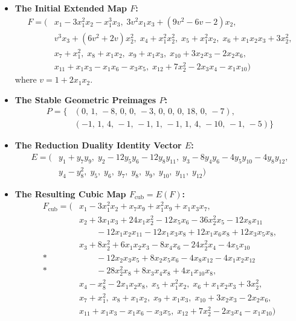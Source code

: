 \documentclass[11pt,a4paper]{article}
\begin{document}
\begin{itemize}
    \item \textbf{The Initial Extended Map $F$:} 
    \begin{align*}
    F = \big( & x_1 - 3x_1^2x_2 - x_1^3x_3, \; 3v^2x_1x_3 + (9v^2-6v-2)x_2, \\ 
    & v^3x_3 + (6v^2+2v)x_2^2, \; x_4 + x_1^2x_2^2, \; x_5 + x_1^2x_2, \; x_6 + x_1x_2x_3 + 3x_2^2, \\
    & x_7 + x_1^2, \; x_8 + x_1x_2, \; x_9 + x_1x_3, \; x_{10} + 3x_2x_3 - 2x_2 x_6, \\
    & x_{11} + x_1x_3 - x_1x_6 - x_3x_5, \; x_{12} + 7x_2^2 - 2x_3x_4 - x_1x_{10} \big)
    \end{align*}
    where $v = 1 + 2x_1x_2$.
    
    \item \textbf{The Stable Geometric Preimages $P$:}
    \begin{align*}
    P = \big\{ & (0, \, 1, \, -8, \, 0, \, 0, \, -3, \, 0, \, 0, \, 0, \, 18, \, 0, \, -7), \\
               & (-1, \, 1, \, 4, \, -1, \, -1, \, 1, \, -1, \, 1, \, 4, \, -10, \, -1, \, -5) \big\}
    \end{align*}
    
    \item \textbf{The Reduction Duality Identity Vector $E$:}
    \begin{align*}
    E = \big( & y_1 + y_7y_9, \; y_2 - 12y_5y_6 - 12y_8y_{11}, \; y_3 - 8y_4y_6 - 4y_5y_{10} - 4y_8y_{12}, \\
              & y_4 - y_8^2, \; y_5, \; y_6, \; y_7, \; y_8, \; y_9, \; y_{10}, \; y_{11}, \; y_{12} \big)
    \end{align*}
    
    \item \textbf{The Resulting Cubic Map $F_{\text{cub}} = E(F)$:}
    \begin{align*}
    F_{\text{cub}} = \big( & x_1 - 3x_1^2x_2 + x_7x_9 + x_1^2x_9 + x_1x_3x_7, \\
    & x_2  + 3x_1x_3 + 24x_1x_2^2 - 12x_5x_6 - 36x_2^2x_5 - 12x_8x_{11} \\
    & \qquad - 12x_1x_2x_{11} - 12x_1x_3x_8 + 12x_1x_6x_8 + 12x_3x_5x_8, \\ 
    & x_3 + 8x_2^2 + 6x_1x_2x_3 - 8x_4x_6 - 24x_2^2x_4 - 4x_5x_{10} \\*
    & \qquad - 12x_2x_3x_5 + 8x_2x_5x_6 - 4x_8x_{12} - 4x_1x_2x_{12} \\*
    & \qquad  -28x_2^2x_8 + 8x_3x_4x_8 + 4x_1x_{10}x_8, \\
    & x_4 - x_8^2 - 2x_1x_2x_8, \; x_5 + x_1^2x_2, \; x_6 + x_1x_2x_3 + 3x_2^2, \\
    & x_7 + x_1^2, \; x_8 + x_1x_2, \; x_9 + x_1x_3, \; x_{10} + 3x_2x_3 - 2x_2 x_6, \\
    & x_{11} + x_1x_3 - x_1x_6 - x_3x_5, \; x_{12} + 7x_2^2 - 2x_3x_4 - x_1x_{10} \big)
    \end{align*}
\end{itemize}
\end{document}
